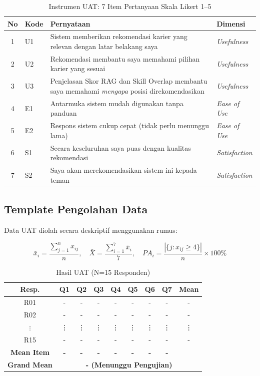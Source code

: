 \begin{table}[H]
\centering
\caption{Instrumen UAT: 7 Item Pertanyaan Skala Likert 1--5}
\label{tab:instrumen_uat}
\begin{tabularx}{\textwidth}{clXl}
\toprule
\textbf{No} & \textbf{Kode} & \textbf{Pernyataan} & \textbf{Dimensi} \\
\midrule
1 & U1 & Sistem memberikan rekomendasi karier yang relevan dengan latar belakang saya & \textit{Usefulness} \\
2 & U2 & Rekomendasi membantu saya memahami pilihan karier yang sesuai & \textit{Usefulness} \\
3 & U3 & Penjelasan Skor RAG dan Skill Overlap membantu saya memahami \textit{mengapa} posisi direkomendasikan & \textit{Usefulness} \\
4 & E1 & Antarmuka sistem mudah digunakan tanpa panduan & \textit{Ease of Use} \\
5 & E2 & Respons sistem cukup cepat (tidak perlu menunggu lama) & \textit{Ease of Use} \\
6 & S1 & Secara keseluruhan saya puas dengan kualitas rekomendasi & \textit{Satisfaction} \\
7 & S2 & Saya akan merekomendasikan sistem ini kepada teman & \textit{Satisfaction} \\
\bottomrule
\end{tabularx}
\end{table}

\subsection{Template Pengolahan Data}
Data UAT diolah secara deskriptif menggunakan rumus:

\begin{equation}
  \bar{x}_i = \frac{\sum_{j=1}^{n} x_{ij}}{n}, \quad
  \bar{X} = \frac{\sum_{i=1}^{7} \bar{x}_i}{7}, \quad
  PA_i = \frac{|\{j : x_{ij} \geq 4\}|}{n} \times 100\%
  \label{eq:uat_formulas}
\end{equation}

\begin{table}[H]
\centering
\caption{Hasil UAT (N=15 Responden)}
\label{tab:hasil_uat}
\begin{tabular}{ccccccccc}
\toprule
\textbf{Resp.} & \textbf{Q1} & \textbf{Q2} & \textbf{Q3} & \textbf{Q4} & \textbf{Q5} & \textbf{Q6} & \textbf{Q7} & \textbf{Mean} \\
\midrule
R01 & - & - & - & - & - & - & - & - \\
R02 & - & - & - & - & - & - & - & - \\
$\vdots$ & \vdots & \vdots & \vdots & \vdots & \vdots & \vdots & \vdots & \vdots \\
R15 & - & - & - & - & - & - & - & - \\
\midrule
\textbf{Mean Item} & \textbf{-} & \textbf{-} & \textbf{-} & \textbf{-} & \textbf{-} & \textbf{-} & \textbf{-} & \\
\textbf{Grand Mean} & \multicolumn{8}{c}{\textbf{- (Menunggu Pengujian)}} \\
\bottomrule
\end{tabular}
\end{table}


